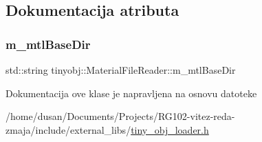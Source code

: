 \subsection{Dokumentacija atributa}
\mbox{\label{classtinyobj_1_1MaterialFileReader_aeb0081a32915ccf6c5c0612335eef560}} 
\subsubsection{\texorpdfstring{m\+\_\+mtl\+Base\+Dir}{m\_mtlBaseDir}}
{\footnotesize\ttfamily std\+::string tinyobj\+::\+Material\+File\+Reader\+::m\+\_\+mtl\+Base\+Dir\hspace{0.3cm}{\ttfamily [private]}}



Dokumentacija ove klase je napravljena na osnovu datoteke \begin{DoxyCompactItemize}
\item 
/home/dusan/\+Documents/\+Projects/\+R\+G102-\/vitez-\/reda-\/zmaja/include/external\+\_\+libs/\hyperlink{tiny__obj__loader_8h}{tiny\+\_\+obj\+\_\+loader.\+h}\end{DoxyCompactItemize}
